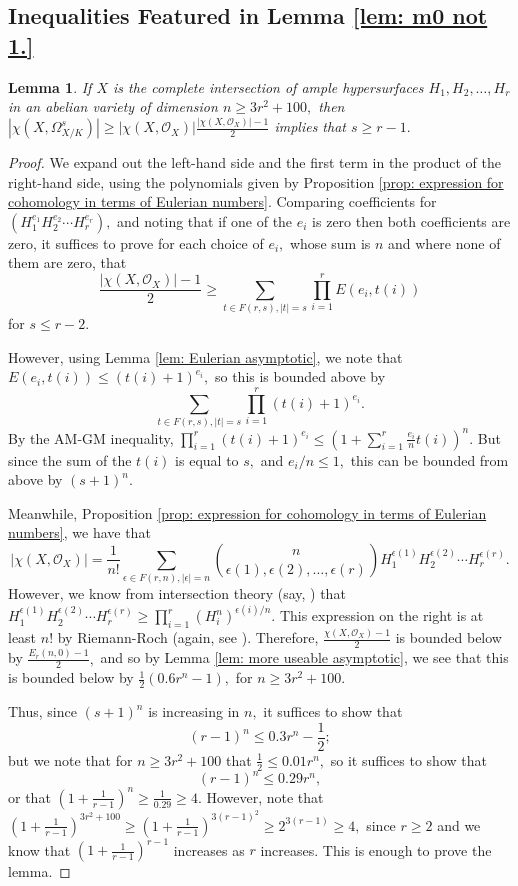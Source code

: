 \documentclass{article}
\newtheorem{lemma}[thm]{Lemma}
\theoremstyle{definition}
\theoremstyle{remark}
\begin{document}
\subsection{Inequalities Featured in Lemma \ref{lem: m0 not 1.}}
\begin{lemma}\label{lem: inequality to show mH(w-s) not 0 means s large}
If $X$ is the complete intersection of ample hypersurfaces $H_1, H_2, \ldots, H_r$ in an abelian variety of dimension $n \geq 3r^2 + 100,$ then $|\chi(X, \Omega^s_{X/K})| \geq |\chi(X, \mathcal{O}_X)|\frac{|\chi(X, \mathcal{O}_X)| - 1}{2}$ implies that $s \geq r - 1.$
\end{lemma}
\begin{proof}
We expand out the left-hand side and the first term in the product of the right-hand side, using the polynomials given by Proposition \ref{prop: expression for cohomology in terms of Eulerian numbers}. Comparing coefficients for $(H_1^{e_1}H_2^{e_2} \cdots H_r^{e_r}),$ and noting that if one of the $e_i$ is zero then both coefficients are zero, it suffices to prove for each choice of $e_i,$ whose sum is $n$ and where none of them are zero, that \[\frac{|\chi(X, \mathcal{O}_X)| - 1}{2} \geq \sum\limits_{t \in F(r, s), |t| = s} \prod\limits_{i=1}^r E(e_i, t(i))\] for $s \leq r - 2.$
\par However, using Lemma \ref{lem: Eulerian asymptotic}, we note that $E(e_i, t(i)) \leq (t(i) + 1)^{e_i},$ so this is bounded above by $$\sum\limits_{t \in F(r, s), |t| = s} \prod\limits_{i=1}^r (t(i) + 1)^{e_i}.$$ By the AM-GM inequality, $\prod\limits_{i=1}^r (t(i) + 1)^{e_i} \leq \left(1 + \sum\limits_{i=1}^r \frac{e_i}{n} t(i) \right)^n.$ But since the sum of the $t(i)$ is equal to $s,$ and $e_i/n \leq 1,$ this can be bounded from above by $(s+1)^n.$
\par Meanwhile, Proposition \ref{prop: expression for cohomology in terms of Eulerian numbers}, we have that \[|\chi(X, \mathcal{O}_X)| = \frac{1}{n!} \sum\limits_{\epsilon \in F(r, n), |\epsilon| = n} \binom{n}{\epsilon(1), \epsilon(2), \ldots, \epsilon(r)} H_1^{\epsilon(1)} H_2^{\epsilon(2)}\cdots H _r^{\epsilon(r)}.\] However, we know from intersection theory (say, \cite[Theorem 1.6.1]{lazarsfeld}) that $H_1^{\epsilon(1)} H_2^{\epsilon(2)}\cdots H _r^{\epsilon(r)} \geq \prod\limits_{i=1}^r (H_i^n)^{\epsilon(i)/n}.$ This expression on the right is at least $n!$ by Riemann-Roch (again, see \cite[\S 16]{mumford}). Therefore, $\frac{\chi(X, \mathcal{O}_X) - 1}{2}$ is bounded below by $\frac{E_r(n, 0) - 1}{2},$ and so by Lemma \ref{lem: more useable asymptotic}, we see that this is bounded below by $\frac{1}{2}\left(0.6 r^n - 1\right),$ for $n \geq 3r^2 + 100.$ 
\par Thus, since $(s+1)^n$ is increasing in $n,$ it suffices to show that \[(r-1)^n \leq 0.3r^n - \frac{1}{2};\] but we note that for $n \geq 3r^2 + 100$ that $\frac{1}{2} \leq 0.01r^n,$ so it suffices to show that $$(r-1)^n \leq 0.29r^n,$$ or that $\left(1 + \frac{1}{r-1}\right)^n \geq \frac{1}{0.29} \geq 4.$ However, note that $\left(1 + \frac{1}{r-1}\right)^{3r^2 + 100} \geq (1 + \frac{1}{r-1})^{3(r-1)^2} \geq 2^{3(r-1)} \geq 4,$ since $r \geq 2$ and we know that $(1 + \frac{1}{r-1})^{r-1}$ increases as $r$ increases. This is enough to prove the lemma.  
\end{proof}
\end{document}
